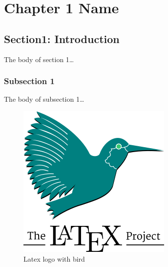 \chapter{Chapter 1 Name}\label{ch1}


\section{Section1: Introduction}

The body of section 1\ldots

\subsection{Subsection 1}

The body of subsection 1\ldots

\begin{figure}[H]
    \centering
    \includegraphics{figures/latex.png}
    \caption{Latex logo with bird}\label{fig:latex_fig}
\end{figure}













